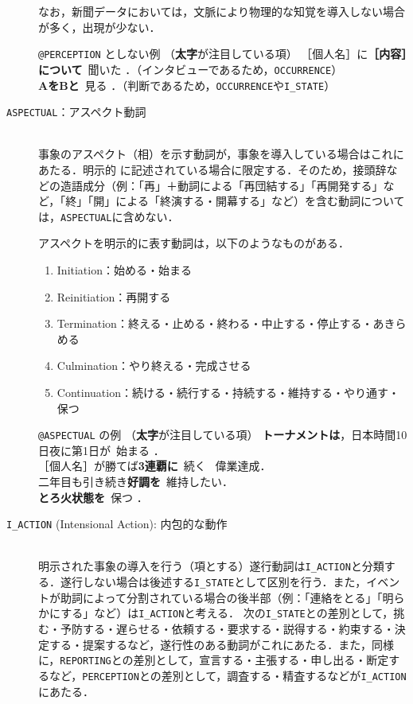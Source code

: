 \documentclass[japanese]{jnlp_1.4}
\def\event{}
\def\eventc{}
\begin{document}
\begin{description}
なお，新聞データにおいては，文脈により物理的な知覚を導入しない場合が多く，出現が少ない．

\begin{itembox}[l]{\event\texttt{@PERCEPTION} としない例 （{\bf 太字}が注目している項）} 
\small 
［個人名］に{\bf ［内容］について}\event\ 聞いた \eventc．（インタビューであるため，{\tt OCCURRENCE}）\\
{\bf AをBと}\event\ 見る \eventc．（判断であるため，{\tt OCCURRENCE}や{\tt I\_STATE}）
\end{itembox}

\item[{\tt ASPECTUAL}：アスペクト動詞]\mbox{}\\
事象のアスペクト（相）を示す動詞が，事象を導入している場合はこれにあたる．明示的
に記述されている場合に限定する．そのため，接頭辞などの造語成分（例：「再」＋動詞による「再団結する」「再開発する」など，「終」「開」による「終演する・開幕する」など）を含む動詞については，{\tt ASPECTUAL}に含めない．

\newpage
アスペクトを明示的に表す動詞は，以下のようなものがある．
\begin{enumerate}
\item Initiation：始める・始まる
\item Reinitiation：再開する
\item Termination：終える・止める・終わる・中止する・停止する・あきらめる
\item Culmination：やり終える・完成させる
\item Continuation：続ける・続行する・持続する・維持する・やり通す・保つ
\end{enumerate}

\begin{itembox}[l]{\event\texttt{@ASPECTUAL} の例 （{\bf 太字}が注目している項）} 
\small 
{\bf トーナメントは}，日本時間10日夜に第1日が\event\ 始まる \eventc．\\
［個人名］が勝てば{\bf 3連覇に}\event\ 続く \eventc\ 偉業達成．\\
二年目も引き続き{\bf 好調を}\event\ 維持したい\eventc．\\
{\bf とろ火状態を}\event\ 保つ \eventc．
\end{itembox}


\item[{\tt I\_ACTION} (Intensional Action): 内包的な動作]\mbox{}\\
明示された事象の導入を行う（項とする）遂行動詞は{\tt I\_ACTION}と分類する．遂行しない場合は後述する{\tt I\_STATE}として区別を行う．また，イベントが助詞によって分割されている場合の後半部（例：「連絡をとる」「明らかにする」など）は{\tt I\_ACTION}と考える．
次の{\tt I\_STATE}との差別として，挑む・予防する・遅らせる・依頼する・要求する・説得する・約束する・決定する・提案するなど，遂行性のある動詞がこれにあたる．また，同様に，{\tt REPORTING}との差別として，宣言する・主張する・申し出る・断定するなど，{\tt PERCEPTION}との差別として，調査する・精査するなどが{\tt I\_ACTION}にあたる．


\end{description}
\end{document}
